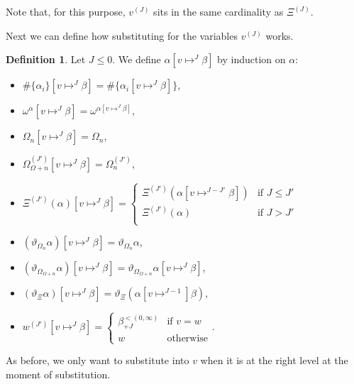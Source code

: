 \documentclass[11pt]{amsart}
\theoremstyle{definition}
\newtheorem{definition}[theorem]{Definition}
\begin{document}
Note that, for this purpose, $v^{(J)}$ sits in the same cardinality as $\Xi^{(J)}$.

Next we can define how substituting for the variables $v^{(J)}$ works.
\begin{definition}
  Let $J\leq 0$. We define $\alpha[v\mapsto^{J}\beta]$ by induction on $\alpha$:
  \begin{itemize}
  \item $\#\{\alpha_i\}[v\mapsto^{J}\beta]=\#\{\alpha_i[v\mapsto^{J}\beta]\}$,
  \item $\omega^\alpha[v\mapsto^{J}\beta]=\omega^{\alpha[v\mapsto^{J}\beta]}$,
  \item $\Omega_n[v\mapsto^J\beta]=\Omega_n$,
  \item $\Omega^{(J')}_{\Omega+n}[v\mapsto^J\beta]=\Omega^{(J')}_n$,
  \item $\Xi^{(J')}(\alpha)[v\mapsto^{J}\beta]=
    \left\{\begin{array}{ll}
             \Xi^{(J')}(\alpha[v\mapsto^{J-J'}\beta])&\text{if }J\leq J'\\
             \Xi^{(J')}(\alpha)&\text{if }J>J'\\
           \end{array}\right.$
       \item $(\vartheta_{\Omega_n}\alpha)[v\mapsto^{J}\beta]=\vartheta_{\Omega_n}\alpha$,
       \item $(\vartheta_{\Omega_{\Omega+n}}\alpha) [v\mapsto^{J}\beta]=\vartheta_{\Omega_{\Omega+n}}\alpha[v\mapsto^{J}\beta]$,
       \item $(\vartheta_\Xi\alpha)[v\mapsto^{J}\beta]=\vartheta_\Xi(\alpha[v\mapsto^{J-1}]\beta)$,
  \item $w^{(J')}[v\mapsto^{J}\beta]=\left\{\begin{array}{ll}
                                              \beta^{< (0,\infty)}_{+J}&\text{if }v=w\\
                                              w&\text{otherwise}
                                            \end{array}\right.$.
  \end{itemize}

\end{definition}

As before, we only want to substitute into $v$ when it is at the right level at the moment of substitution.
\end{document}
